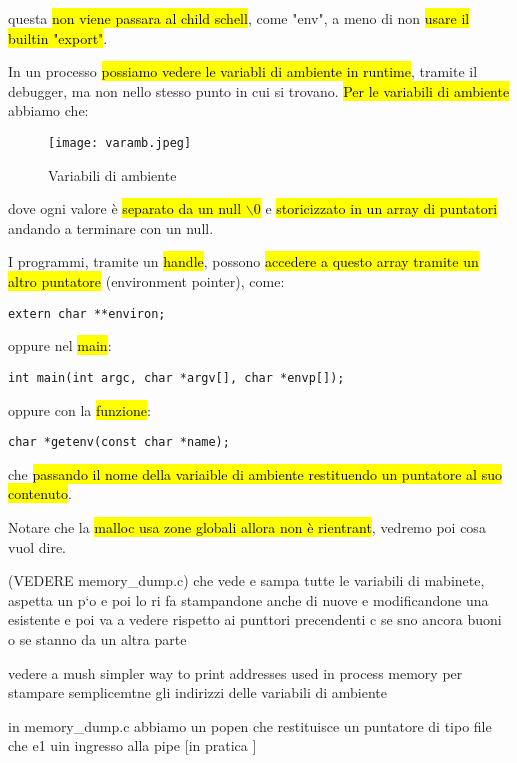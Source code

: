 questa \hl{non viene passara al child schell}, come "env", a meno di non \hl{usare il builtin "export"}.

In un processo \hl{possiamo vedere le variabli di ambiente in runtime}, tramite il debugger, ma non nello stesso punto in cui si trovano. \hl{Per le variabili di ambiente} abbiamo che:


\begin{figure}[H]
\centering
\texttt{[image: varamb.jpeg]}
\caption{Variabili di ambiente} 
\label{varamb}
\end{figure}


dove ogni valore è \hl{separato da un null $\backslash 0$} e \hl{storicizzato in un array di puntatori} andando a terminare con un null.

I programmi, tramite un \hl{handle}, possono \hl{accedere a questo array tramite un altro puntatore} (environment pointer), come:

\begin{lstlisting}
extern char **environ;
\end{lstlisting}

oppure nel \hl{main}:
\begin{lstlisting}
int main(int argc, char *argv[], char *envp[]);
\end{lstlisting}

oppure con la \hl{funzione}:
\begin{lstlisting}
char *getenv(const char *name);
\end{lstlisting}

che \hl{passando il nome della variaible di ambiente restituendo un puntatore al suo contenuto}.

Notare che la \hl{malloc usa zone globali allora non è rientrant}, vedremo poi cosa vuol dire.






(VEDERE memory\_dump.c) che vede e sampa tutte le variabili di mabinete, aspetta un p`o e poi lo ri fa stampandone anche di nuove e modificandone una esistente e poi va a vedere rispetto ai punttori precendenti c se sno ancora buoni  o se stanno da un altra parte

vedere a mush simpler way to print addresses used in process memory per stampare semplicemtne gli indirizzi delle variabili di ambiente


in memory\_dump.c abbiamo un popen che restituisce un puntatore di tipo file che e1 uin ingresso alla pipe [in pratica ]

